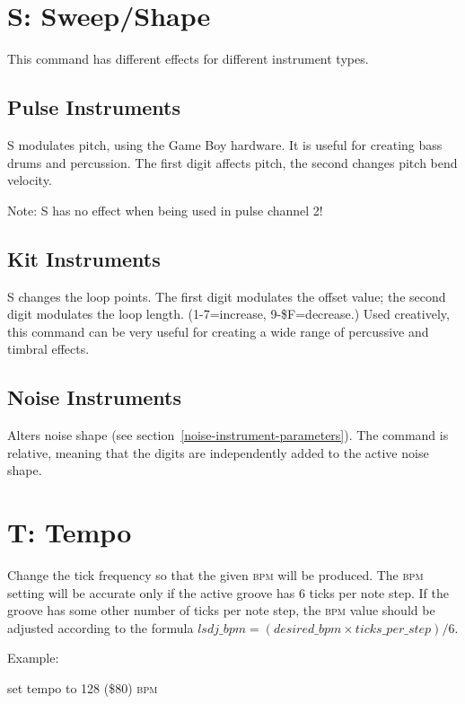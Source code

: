 \section{S: Sweep/Shape}

This command has different effects for different instrument types.

\subsection{Pulse Instruments}

S modulates pitch, using the Game Boy hardware. It is useful for creating bass drums and percussion. The first digit affects pitch, the second changes pitch bend velocity.

Note: S has no effect when being used in pulse channel 2!

\subsection{Kit Instruments}

S changes the loop points. The first digit modulates the offset value; the second digit modulates the loop length. (1-7=increase, 9-\$F=decrease.) Used creatively, this command can be very useful for creating a wide range of percussive and timbral effects.

\subsection{Noise Instruments}

Alters noise shape (see section~\ref{noise-instrument-parameters}).
The command is relative, meaning that the digits are independently added to the active noise shape.

\section{T: Tempo}

Change the tick frequency so that the given \textsc{bpm} will be produced. The \textsc{bpm} setting will be accurate only if the active groove has 6 ticks per note step. If the groove has some other number of ticks per note step, the \textsc{bpm} value should be adjusted according to the formula
\begin{math}
lsdj\_bpm = (desired\_bpm \times ticks\_per\_step)/{6}
\end{math}.

\begin{description}
\item Example:
\item[T80] set tempo to 128 (\$80) \textsc{bpm}
\end{description}

